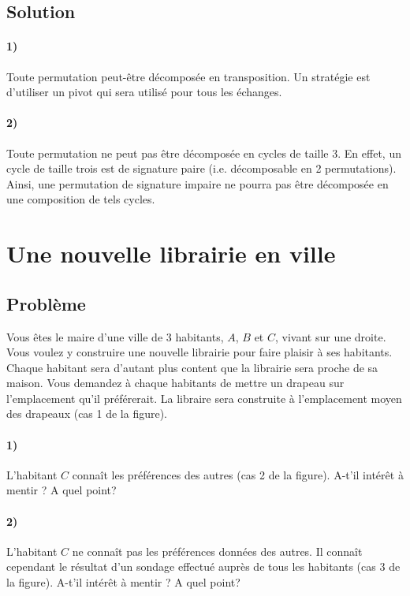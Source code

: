 \documentclass[a4paper,10pt,oneside]{article}
\begin{document}
\subsection{Solution}

\paragraph*{1)}
Toute permutation peut-être décomposée en transposition. 
Un stratégie est d'utiliser un pivot qui sera utilisé pour tous les échanges.

\paragraph*{2)} 
Toute permutation ne peut pas être décomposée en cycles de taille 3. 
En effet, un cycle de taille trois est de signature paire (i.e. décomposable en 2 permutations).
Ainsi, une permutation de signature impaire ne pourra pas être décomposée en une composition de tels cycles.


\section{Une nouvelle librairie en ville}


\subsection{Problème}

Vous êtes le maire d'une ville de 3 habitants, $A$, $B$ et $C$,  vivant sur une droite.
Vous voulez y construire une nouvelle librairie pour faire plaisir à ses habitants.
Chaque habitant sera d'autant plus content que la librairie sera proche de sa maison. 
Vous demandez à chaque habitants de mettre un drapeau sur l'emplacement qu'il préférerait.
La libraire sera construite à l'emplacement moyen des drapeaux (cas 1 de la figure).

\paragraph*{1)} 
L'habitant $C$ connaît les préférences des autres (cas 2 de la figure).
A-t'il intérêt à mentir ? A quel point?

\paragraph*{2)} 
L'habitant $C$ ne connaît pas les préférences données des autres.
Il connaît cependant le résultat d'un sondage effectué auprès de tous les habitants (cas 3 de la figure).
A-t'il intérêt à mentir ? A quel point?
\end{document}
